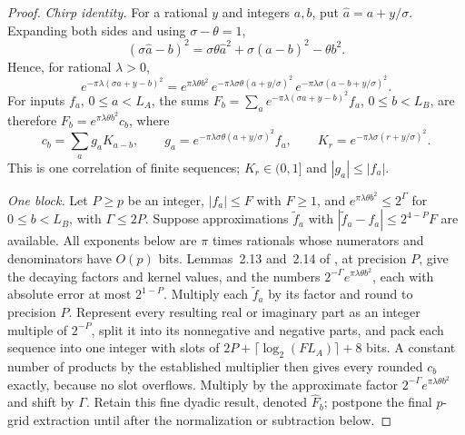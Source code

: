 \begin{proof}
\emph{Chirp identity.} For a rational $y$ and integers $a,b$, put
$\hat a=a+y/\sigma$. Expanding both sides and using $\sigma-\theta=1$,
\[
 (\sigma\hat a-b)^2
   =\sigma\theta\hat a^2+\sigma(\hat a-b)^2-\theta b^2 .
\]
Hence, for rational $\lambda>0$,
\begin{equation}\label{eq:chirp-split}
 e^{-\pi\lambda(\sigma a+y-b)^2}
  =e^{\pi\lambda\theta b^2}\,
   e^{-\pi\lambda\sigma\theta(a+y/\sigma)^2}\,
   e^{-\pi\lambda\sigma(a-b+y/\sigma)^2}.
\end{equation}
For inputs $f_a$, $0\le a<L_A$, the sums
$F_b=\sum_ae^{-\pi\lambda(\sigma a+y-b)^2}f_a$, $0\le b<L_B$, are therefore
$F_b=e^{\pi\lambda\theta b^2}c_b$, where
\[
 c_b=\sum_ag_aK_{a-b},\qquad
 g_a=e^{-\pi\lambda\sigma\theta(a+y/\sigma)^2}f_a,\qquad
 K_r=e^{-\pi\lambda\sigma(r+y/\sigma)^2}.
\]
This is one correlation of finite sequences; $K_r\in(0,1]$ and
$|g_a|\le|f_a|$.

\emph{One block.} Let $P\ge p$ be an integer, $|f_a|\le F$ with $F\ge1$,
and $e^{\pi\lambda\theta b^2}\le2^{\Gamma}$ for $0\le b<L_B$, with
$\Gamma\le2P$. Suppose approximations $\widetilde f_a$ with
$|\widetilde f_a-f_a|\le2^{4-P}F$ are available. All exponents below are $\pi$
times rationals whose numerators and denominators have $O(p)$ bits.
Lemmas~2.13 and~2.14 of \cite{HarveyHoeven2021}, at precision $P$, give the
decaying factors and kernel values, and the numbers
$2^{-\Gamma}e^{\pi\lambda\theta b^2}$, each with absolute error at most
$2^{1-P}$. Multiply each $\widetilde f_a$ by its factor and round to
precision $P$.
Represent every resulting real or imaginary part as an integer multiple of
$2^{-P}$, split it into its nonnegative and negative parts, and pack each
sequence into one integer with slots of $2P+\lceil\log_2(FL_A)\rceil+8$
bits. A constant number of products by the established multiplier
\cite[Theorem~1.1]{HarveyHoeven2021} then gives every rounded $c_b$
exactly, because no slot overflows. Multiply by the approximate factor
$2^{-\Gamma}e^{\pi\lambda\theta b^2}$ and shift by $\Gamma$.
Retain this fine dyadic result, denoted $\widehat F_b$; postpone the final
$p$-grid extraction until after the normalization or subtraction below.


\end{proof}
